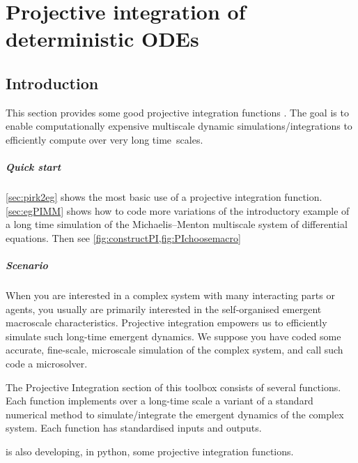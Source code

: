 \chapter{Projective integration of deterministic ODEs}
\label{sec:ProjInt}
\localtableofcontents


\section{Introduction}

This section provides some good projective integration functions \cite[e.g.]{Gear02b, Gear03c, Givon06, Marschler2014b, Maclean2015, Sieber2018}.
The goal is to enable computationally expensive multiscale dynamic simulations\slash integrations to efficiently compute over very long time~scales.

\paragraph{Quick start} 
\cref{sec:pirk2eg} shows the most basic use of a projective integration function.
\cref{sec:egPIMM} shows how to code more variations of the introductory example of a long time simulation of the Michaelis--Menton multiscale system of differential equations.
Then see \cref{fig:constructPI,fig:PIchoosemacro}

\paragraph{Scenario}
When you are interested in a complex system with many interacting parts or agents, you usually are primarily interested in the self-organised emergent macroscale characteristics.
Projective integration empowers us to efficiently simulate such long-time emergent dynamics.
We suppose you have coded some accurate, fine-scale, microscale simulation of the complex system, and call such code a microsolver.

The Projective Integration section of this toolbox consists of several functions.
Each function implements over a long-time scale a variant of a standard numerical method to simulate\slash integrate the emergent dynamics of the complex system.
Each function has standardised inputs and outputs.

\cite{Petersik2019} is also developing, in python, some projective integration functions.


